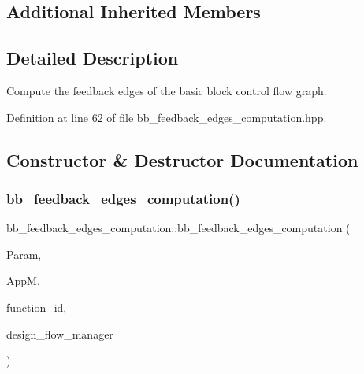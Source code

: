 \subsection*{Additional Inherited Members}


\subsection{Detailed Description}
Compute the feedback edges of the basic block control flow graph. 

Definition at line 62 of file bb\+\_\+feedback\+\_\+edges\+\_\+computation.\+hpp.



\subsection{Constructor \& Destructor Documentation}
\mbox{\label{classbb__feedback__edges__computation_a0a273a7279b7bb423fa8c9620c207a52}} 
\subsubsection{\texorpdfstring{bb\+\_\+feedback\+\_\+edges\+\_\+computation()}{bb\_feedback\_edges\_computation()}}
{\footnotesize\ttfamily bb\+\_\+feedback\+\_\+edges\+\_\+computation\+::bb\+\_\+feedback\+\_\+edges\+\_\+computation (\begin{DoxyParamCaption}\item[{const \hyperlink{Parameter_8hpp_a37841774a6fcb479b597fdf8955eb4ea}{Parameter\+Const\+Ref}}]{Param,  }\item[{const \hyperlink{application__manager_8hpp_a04ccad4e5ee401e8934306672082c180}{application\+\_\+manager\+Ref}}]{AppM,  }\item[{unsigned int}]{function\+\_\+id,  }\item[{const Design\+Flow\+Manager\+Const\+Ref}]{design\+\_\+flow\+\_\+manager }\end{DoxyParamCaption})}



